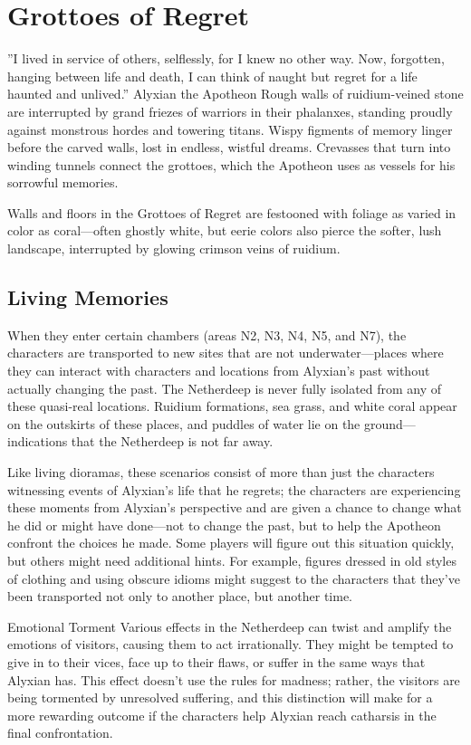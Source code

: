 \documentclass[10pt,a4paper,twoside,fancy,bg=print,twocolumn,openany,nodeprecatedcode]{dndbook}
\begin{document}
\section{Grottoes of Regret}
\DndQuote%
{}
{''I lived in service of others, selflessly, for I knew no other way. Now, forgotten, hanging between life and death, I can think of naught but regret for a life haunted and unlived.''}
{Alyxian the Apotheon}
Rough walls of ruidium-veined stone are interrupted by grand friezes of warriors in their phalanxes, standing proudly against monstrous hordes and towering titans. Wispy figments of memory linger before the carved walls, lost in endless, wistful dreams. Crevasses that turn into winding tunnels connect the grottoes, which the Apotheon uses as vessels for his sorrowful memories.

Walls and floors in the Grottoes of Regret are festooned with foliage as varied in color as coral—often ghostly white, but eerie colors also pierce the softer, lush landscape, interrupted by glowing crimson veins of ruidium.

\subsection{Living Memories}
When they enter certain chambers (areas N2, N3, N4, N5, and N7), the characters are transported to new sites that are not underwater—places where they can interact with characters and locations from Alyxian's past without actually changing the past. The Netherdeep is never fully isolated from any of these quasi-real locations. Ruidium formations, sea grass, and white coral appear on the outskirts of these places, and puddles of water lie on the ground—indications that the Netherdeep is not far away.

Like living dioramas, these scenarios consist of more than just the characters witnessing events of Alyxian's life that he regrets; the characters are experiencing these moments from Alyxian's perspective and are given a chance to change what he did or might have done—not to change the past, but to help the Apotheon confront the choices he made. Some players will figure out this situation quickly, but others might need additional hints. For example, figures dressed in old styles of clothing and using obscure idioms might suggest to the characters that they've been transported not only to another place, but another time.

\begin{DndSidebar}[float=!b]{Emotional Torment}
Various effects in the Netherdeep can twist and amplify the emotions of visitors, causing them to act irrationally. They might be tempted to give in to their vices, face up to their flaws, or suffer in the same ways that Alyxian has. This effect doesn't use the rules for madness; rather, the visitors are being tormented by unresolved suffering, and this distinction will make for a more rewarding outcome if the characters help Alyxian reach catharsis in the final confrontation.



\end{DndSidebar}
\end{document}

